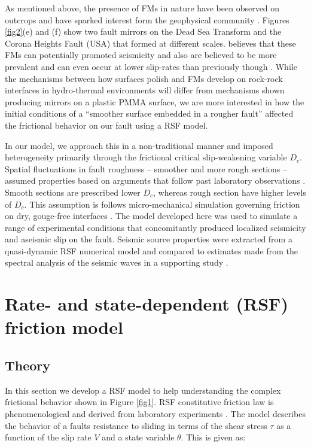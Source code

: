 \documentclass[final,3p, 11pt,authoryear]{elsarticle}
\begin{document}
As mentioned above, the presence of FMs in nature have been observed on outcrops and have sparked interest form the geophysical community \citep{Fondriest2013, Kirkpartick2013, Siman-Tov2013}.  Figures \ref{fig2}(e) and (f) show two fault mirrors on the Dead Sea Transform and the Corona Heights Fault (USA) that formed at different scales.  \citep{Goldberg2016} believes that these FMs can potentially promoted seismicity and also are believed to be more prevalent and can even occur at lower slip-rates than previously though \citep{Verbena2019}.  While the mechanisms between how surfaces polish and FMs develop on rock-rock interfaces in hydro-thermal environments will differ from mechanisms shown producing mirrors on a plastic PMMA surface, we are  more interested in how the initial conditions of a ``smoother surface embedded in a rougher fault'' affected the frictional behavior on our fault using a RSF model. 

 In our model, we approach this in a non-traditional manner and imposed heterogeneity primarily through the frictional critical slip-weakening variable $D_{c}$. Spatial fluctuations in fault roughness -- smoother and more rough sections -- assumed properties based on arguments that follow past laboratory observations \citep{Dieterich1981, Marone1973, Marone1994}. Smooth sections are prescribed lower $D_{c}$, whereas rough section have higher levels of $D_{c}$. This assumption is follows micro-mechanical simulation governing friction on dry, gouge-free interfaces \citep{Yoshioka1996}. The model developed here was used to simulate a range of experimental conditions that concomitantly produced localized seismicity and aseismic slip on the fault. Seismic source properties were extracted from a quasi-dynamic RSF numerical model and compared to estimates made from the spectral analysis of the seismic waves in a supporting study \citep{Selvadurai2019}. 

\section{Rate- and state-dependent (RSF) friction model}
\subsection{Theory}
\label{Theory}

In this section we develop a RSF model to help understanding the complex frictional behavior shown in Figure \ref{fig1}.  RSF constitutive friction law is phenomenological and derived from laboratory experiments \citep{Dieterich1979}.  The model describes the behavior of a faults resistance to sliding in terms of the shear stress $\tau$ as a function of the slip rate $V$ and a state variable $\theta$. This is given as:
\end{document}
